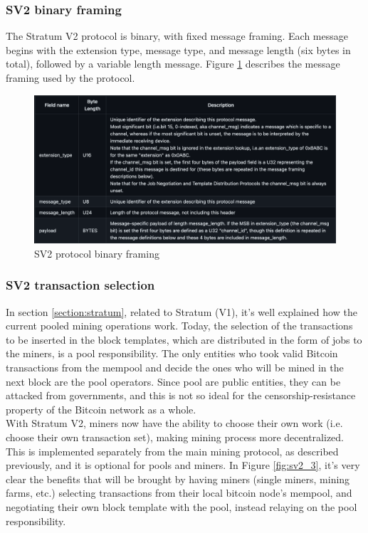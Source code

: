 \subsubsection{SV2 binary framing}\label{sssec:sv2_framing}
The Stratum V2 protocol is binary, with fixed message framing. Each message begins with the extension type, message type, and message length (six bytes in total), followed by a variable length message. Figure \ref{fig:sv2_4} describes the message framing used by the protocol.

\begin{figure}[h!]
    \centering
    \includegraphics[width=15cm]{Figures/sv2/sv2_4.png}
    \caption{SV2 protocol binary framing}
    \label{fig:sv2_4}
\end{figure}

\subsubsection{SV2 transaction selection}
In section \ref{section:stratum}, related to Stratum (V1), it's well explained how the current pooled mining operations work.
Today, the selection of the transactions to be inserted in the block templates, which are distributed in the form of jobs to the miners, is a pool responsibility. The only entities who took valid Bitcoin transactions from the mempool and decide the ones who will be mined in the next block are the pool operators. Since pool are public entities, they can be attacked from governments, and this is not so ideal for the censorship-resistance property of the Bitcoin network as a whole. \\ 
With Stratum V2, miners now have the ability to choose their own work (i.e. choose their own transaction set), making mining process more decentralized. This is implemented separately from the main mining protocol, as described previously, and it is optional for pools and miners. In Figure \ref{fig:sv2_3}, it's very clear the benefits that will be brought by having miners (single miners, mining farms, etc.) selecting transactions from their local bitcoin node's mempool, and negotiating their own block template with the pool, instead relaying on the pool responsibility.\\

